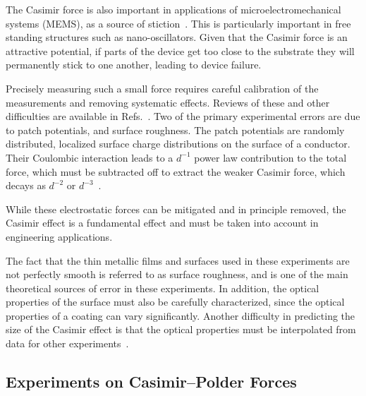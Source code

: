 The Casimir force is also important in applications of microelectromechanical systems (MEMS), 
as a source of stiction~\cite{Tas1996, Serry1998, Buks2001}.  This is particularly important
in free standing structures such as nano-oscillators.  
Given that the Casimir force is an attractive potential, if parts of the device get too close to the substrate
they will permanently stick to one another, leading to device failure.  

Precisely measuring such a small force requires careful calibration of the measurements 
and removing systematic effects.  Reviews of these and other difficulties are available in Refs.~\cite{Lamoreaux2011, vanZwol2011, Bordag2009}.
Two of the primary experimental errors are due to 
patch potentials, and surface roughness.  
The patch potentials are randomly distributed, localized surface charge distributions on the surface of a conductor.  
Their Coulombic interaction leads to a $d^{-1}$ power law contribution to the total force, 
which must be subtracted off to extract the weaker Casimir force, which decays as $d^{-2}$ or $d^{-3}$~\cite{Sushkov2011}.  

 While these electrostatic forces can be mitigated and in principle removed, the Casimir effect is a fundamental 
 effect and must be taken into account in engineering applications.  

The fact that the thin metallic films and surfaces used in these 
experiments are not perfectly smooth is referred to as surface roughness, and is one of 
the main theoretical sources of error in these experiments.  
In addition, the optical properties of the surface must also be carefully characterized, since the 
optical properties of a coating can vary significantly.  Another difficulty in predicting the size of the 
Casimir effect is that the optical properties must be interpolated from data for other experiments~\cite{vanZwol2011}.

\subsection{Experiments on Casimir--Polder Forces}

